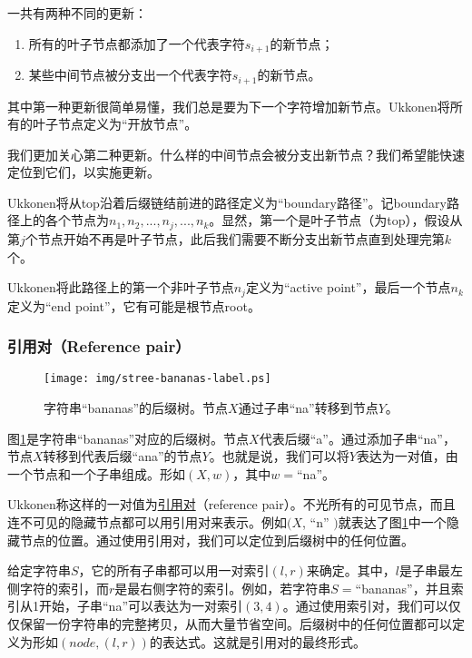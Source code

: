 \documentclass[UTF8]{article}
\begin{document}
一共有两种不同的更新：
\begin{enumerate}
\item 所有的叶子节点都添加了一个代表字符$s_{i+1}$的新节点；
\item 某些中间节点被分支出一个代表字符$s_{i+1}$的新节点。
\end{enumerate}

其中第一种更新很简单易懂，我们总是要为下一个字符增加新节点。Ukkonen将所有的叶子节点定义为“开放节点”。

我们更加关心第二种更新。什么样的中间节点会被分支出新节点？我们希望能快速定位到它们，以实施更新。

Ukkonen将从top沿着后缀链结前进的路径定义为“boundary路径”。记boundary路径上的各个节点为$n_1, n_2, ..., n_j, ..., n_k$。显然，第一个是叶子节点（为top），假设从第$j$个节点开始不再是叶子节点，此后我们需要不断分支出新节点直到处理完第$k$个。

Ukkonen将此路径上的第一个非叶子节点$n_j$定义为“active point”，最后一个节点$n_k$定义为“end point”，它有可能是根节点root。

\subsubsection{引用对（Reference pair）}

\begin{figure}[htbp]
  \centering
  \texttt{[image: img/stree-bananas-label.ps]}
  \caption{字符串“bananas”的后缀树。节点$X$通过子串“na”转移到节点$Y$。}
  \label{fig:stree-bananas-label}
\end{figure}

图\ref{fig:stree-bananas-label}是字符串“bananas”对应的后缀树。节点$X$代表后缀“a”。通过添加子串“na”，节点$X$转移到代表后缀“ana”的节点$Y$。也就是说，我们可以将$Y$表达为一对值，由一个节点和一个子串组成。形如$(X, w)$，其中$w=$“na”。

Ukkonen称这样的一对值为\underline{引用对}（reference pair）。不光所有的可见节点，而且连不可见的隐藏节点都可以用引用对来表示。例如$(X$, “n” $)$就表达了图\ref{fig:stree-bananas-label}中一个隐藏节点的位置。通过使用引用对，我们可以定位到后缀树中的任何位置。

给定字符串$S$，它的所有子串都可以用一对索引$(l, r)$来确定。其中，$l$是子串最左侧字符的索引，而$r$是最右侧字符的索引。例如，若字符串$S=$“bananas”，并且索引从1开始，子串“na”可以表达为一对索引$(3, 4)$。通过使用索引对，我们可以仅仅保留一份字符串的完整拷贝，从而大量节省空间。后缀树中的任何位置都可以定义为形如$(node, (l, r))$的表达式。这就是引用对的最终形式。
\end{document}
